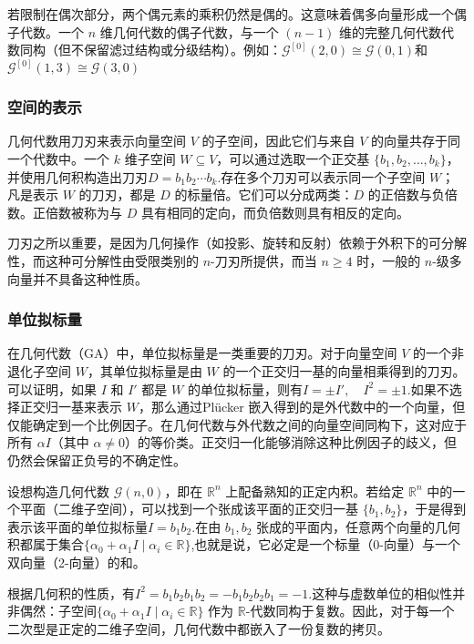 若限制在偶次部分，两个偶元素的乘积仍然是偶的。这意味着偶多向量形成一个偶子代数。一个 $n$ 维几何代数的偶子代数，与一个 $(n-1)$ 维的完整几何代数代数同构（但不保留滤过结构或分级结构）。例如：$\mathcal{G}^{[0]}(2,0) \cong \mathcal{G}(0,1)$和$\mathcal{G}^{[0]}(1,3) \cong \mathcal{G}(3,0)$
\subsubsection{空间的表示}
几何代数用刀刃来表示向量空间 $V$ 的子空间，因此它们与来自 $V$ 的向量共存于同一个代数中。一个 $k$ 维子空间 $W \subseteq V$，可以通过选取一个正交基 $\{b_{1}, b_{2}, \ldots, b_{k}\}$，并使用几何积构造出刀刃$
D = b_{1} b_{2} \cdots b_{k}$.存在多个刀刃可以表示同一个子空间 $W$；凡是表示 $W$ 的刀刃，都是 $D$ 的标量倍。它们可以分成两类：$D$ 的正倍数与负倍数。正倍数被称为与 $D$ 具有相同的定向，而负倍数则具有相反的定向。

刀刃之所以重要，是因为几何操作（如投影、旋转和反射）依赖于外积下的可分解性，而这种可分解性由受限类别的 $n$-刀刃所提供，而当 $n \geq 4$ 时，一般的 $n$-级多向量并不具备这种性质。
\subsubsection{单位拟标量}
在几何代数（GA）中，单位拟标量是一类重要的刀刃。对于向量空间 $V$ 的一个非退化子空间 $W$，其单位拟标量是由 $W$ 的一个正交归一基的向量相乘得到的刀刃。可以证明，如果 $I$ 和 $I'$ 都是 $W$ 的单位拟标量，则有$I =\pm I', \quad I^{2} = \pm 1$.如果不选择正交归一基来表示 $W$，那么通过Plücker 嵌入得到的是外代数中的一个向量，但仅能确定到一个比例因子。在几何代数与外代数之间的向量空间同构下，这对应于所有 $\alpha I$（其中 $\alpha \neq 0$）的等价类。正交归一化能够消除这种比例因子的歧义，但仍然会保留正负号的不确定性。

设想构造几何代数 $\mathcal{G}(n,0)$，即在 $\mathbb{R}^n$ 上配备熟知的正定内积。若给定 $\mathbb{R}^n$ 中的一个平面（二维子空间），可以找到一个张成该平面的正交归一基 $\{b_{1}, b_{2}\}$，于是得到表示该平面的单位拟标量$I = b_{1} b_{2}$.在由 $b_{1}, b_{2}$ 张成的平面内，任意两个向量的几何积都属于集合$\{\alpha_{0}+\alpha_{1} I \mid\alpha_{i} \in \mathbb{R}\}$,也就是说，它必定是一个标量（0-向量）与一个双向量（2-向量）的和。

根据几何积的性质，有$I^{2} = b_{1} b_{2} b_{1} b_{2} = - b_{1} b_{2} b_{2} b_{1} = -1$.这种与虚数单位的相似性并非偶然：子空间$\{\alpha_{0} + \alpha_{1} I \mid \alpha_{i} \in \mathbb{R}\}$
作为 $\mathbb{R}$-代数同构于复数。因此，对于每一个二次型是正定的二维子空间，几何代数中都嵌入了一份复数的拷贝。

